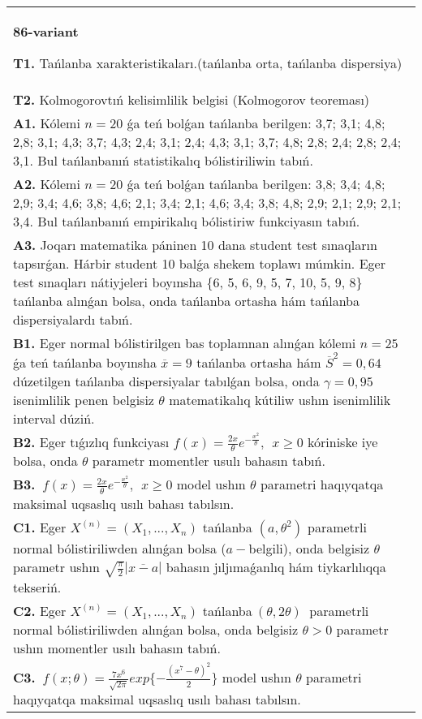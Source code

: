 \documentclass{article}
\begin{document}
\begin{tabular}{m{17cm}}
\textbf{86-variant}
\newline

\textbf{T1.} 
Tańlanba xarakteristikaları.(tańlanba orta, tańlanba dispersiya)
 \\
\textbf{T2.} 
Kolmogorovtıń kelisimlilik belgisi (Kolmogorov teoreması)
 \\
\textbf{A1.} 
Kólemi \(n = 20\) ǵa teń bolǵan tańlanba berilgen: 3,7; 3,1; 4,8; 2,8; 3,1; 4,3; 3,7; 4,3; 2,4; 3,1; 2,4; 4,3; 3,1; 3,7; 4,8; 2,8; 2,4; 2,8; 2,4; 3,1. Bul tańlanbanıń statistikalıq bólistiriliwin tabıń.
 \\
\textbf{A2.} 
Kólemi \(n = 20\) ǵa teń bolǵan tańlanba berilgen: 3,8; 3,4; 4,8; 2,9; 3,4; 4,6; 3,8; 4,6; 2,1; 3,4; 2,1; 4,6; 3,4; 3,8; 4,8; 2,9; 2,1; 2,9; 2,1; 3,4. Bul tańlanbanıń empirikalıq bólistiriw funkciyasın tabıń.
 \\
\textbf{A3.} 
Joqarı matematika páninen 10 dana student test sınaqların tapsırǵan. Hárbir student 10 balǵa shekem toplawı múmkin. Eger test sınaqları nátiyjeleri boyınsha \{6, 5, 6, 9, 5, 7, 10, 5, 9, 8\} tańlanba alınǵan bolsa, onda tańlanba ortasha hám tańlanba dispersiyalardı tabıń.
 \\
\textbf{B1.} 
Eger normal bólistirilgen bas toplamnan alınǵan kólemi \(n = 25\) ǵa teń tańlanba boyınsha \(\overline{x} = 9\) tańlanba ortasha hám \({\overline{S}}^{2} = 0,64\) dúzetilgen tańlanba dispersiyalar tabılǵan bolsa, onda \(\gamma = 0,95\) isenimlilik penen belgisiz \(\theta\) matematikalıq kútiliw ushın isenimlilik interval dúziń.
 \\
\textbf{B2.} 
Eger tıǵızlıq funkciyası \(f(x) = \frac{2x}{\theta}e^{- \frac{x^{2}}{\theta}},\ \ x \geq 0\) kóriniske iye bolsa, onda \(\theta\) parametr momentler usulı bahasın tabıń.
 \\
\textbf{B3.} 
\(\ f(x) = \frac{2x}{\theta}e^{- \frac{x^{2}}{\theta}},\ \ x \geq 0\) model ushın \(\theta\) parametri haqıyqatqa maksimal uqsaslıq usılı bahası tabılsın.
 \\
\textbf{C1.} 
Eger \(X^{(n)} = \left( X_{1},...,X_{n} \right)\) tańlanba \(\left( a,\theta^{2} \right)\) parametrli normal bólistiriliwden alınǵan bolsa (\(a -\)belgili), onda belgisiz \(\theta\) parametr ushın \(\sqrt{\frac{\pi}{2}}\left| \overline{x - a} \right|\) bahasın jıljımaǵanlıq hám tiykarlılıqqa tekseriń.
 \\
\textbf{C2.} 
Eger \(X^{(n)} = \left( X_{1},...,X_{n} \right)\) tańlanba\(\ (\theta,2\theta)\ \) parametrli normal bólistiriliwden alınǵan bolsa, onda belgisiz \(\theta > 0\) parametr ushın momentler usılı bahasın tabıń.
 \\
\textbf{C3.} 
\(\ f(x;\theta) = \frac{7x^{6}}{\sqrt{2\pi}}exp\{ - \frac{(x^{7} - \theta)^{2}}{2}\}\) model ushın \(\theta\) parametri haqıyqatqa maksimal uqsaslıq usılı bahası tabılsın.
 \\

\end{tabular}
\vspace{1cm}
\end{document}
